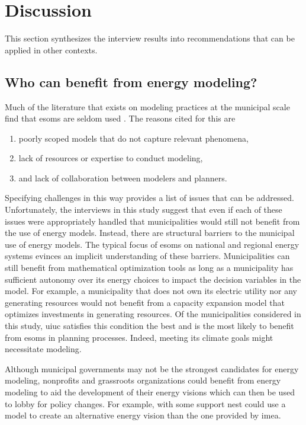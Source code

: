 \section{Discussion}
\label{section:interview-discussion}
This section synthesizes the interview results into recommendations that can be
applied in other contexts.

\subsection{Who can benefit from energy modeling?}
Much of the literature that exists on modeling practices at the municipal scale
find that \acp{esom} are seldom used
\cite{ben_amer_too_2020,johannsen_municipal_2023}. The reasons cited for this
are \cite{ben_amer_too_2020,johannsen_municipal_2023,susser_better_2022}
\begin{enumerate}
    \item poorly scoped models that do not capture relevant phenomena,
    \item lack of resources or expertise to conduct modeling, 
    \item and lack of collaboration between modelers and planners.
\end{enumerate} 
Specifying challenges in this way provides a list of issues that can be
addressed. Unfortunately, the interviews in this study suggest that even if each
of these issues were appropriately handled that municipalities would still not
benefit from the use of energy models. Instead, there are structural barriers to
the municipal use of energy models. The typical focus of \acp{esom} on national
and regional energy systems evinces an implicit understanding of these barriers.
Municipalities can still benefit from mathematical optimization tools as long as
a municipality has sufficient autonomy over its energy choices to impact the
decision variables in the model. For example, a municipality that does not own
its electric utility nor any generating resources would not benefit from a
capacity expansion model that optimizes investments in generating resources. Of
the municipalities considered in this study, \ac{uiuc} satisfies this condition
the best and is the most likely to benefit from \acp{esom} in planning
processes. Indeed, meeting its climate goals might necessitate modeling.

Although municipal governments may not be the strongest candidates for energy
modeling, nonprofits and grassroots organizations could benefit from energy
modeling to aid the development of their energy visions which can then be used
to lobby for policy changes. For example, with some support \ac{nest} could use
a model to create an alternative energy vision than the one provided by
\ac{imea}.


